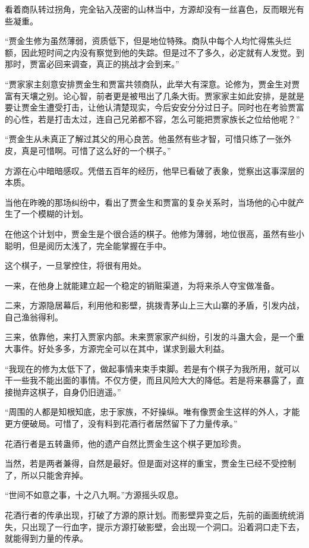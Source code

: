 \begin{this_body}
看着商队转过拐角，完全钻入茂密的山林当中，方源却没有一丝喜色，反而眼光有些凝重。

“贾金生修为虽然薄弱，资质低下，但是地位特殊。商队中每个人均忙得焦头烂额，因此短时间之内没有察觉到他的失踪。但是过不了多久，必定就有人发觉。到那时，贾富必回来调查，真正的挑战才会到来。”

“贾家家主刻意安排贾金生和贾富共领商队，此举大有深意。论修为，贾金生对贾富有天壤之别。论心智，前者更是被甩出了几条大街。贾家家主如此安排，是就是要让贾金生遭受打击，让他认清楚现实，今后安安分分过日子。同时也在考验贾富的心性，若是打击太过，连自己兄弟都不容，怎么可能把贾家族长之位给他呢？”

“贾金生从未真正了解过其父的用心良苦。他虽然有些才智，可惜只练了一张外皮，真是可惜啊。可惜了这么好的一个棋子。”

方源在心中暗暗感叹。凭借五百年的经历，他早已看破了表象，觉察出这事深层的本质。

当他在昨晚的那场纠纷中，看出了贾金生和贾富的复杂关系时，当场他的心中就产生了一个模糊的计划。

在他这个计划中，贾金生是个很合适的棋子。他修为薄弱，地位很高，虽然有些小聪明，但是阅历太浅了，完全能掌握在手中。

这个棋子，一旦掌控住，将很有用处。

一来，在他身上就能建立起一个稳定的销赃渠道，为将来杀人夺宝做准备。

二来，方源隐居幕后，利用他和影壁，挑拨青茅山上三大山寨的矛盾，引发内战，自己渔翁得利。

三来，依靠他，来打入贾家内部。未来贾家家产纠纷，引发的斗蛊大会，是一个重大事件。好处多多，方源完全可以在其中，谋求到最大利益。

“我现在的修为太低下了，做起事情来束手束脚。若是有个棋子为我所用，就可以干一些我不能出面的事情。不仅方便，而且风险大大的降低。若是将来暴露了，直接抛弃这棋子，自身仍旧逍遥。”

“周围的人都是知根知底，忠于家族，不好操纵。唯有像贾金生这样的外人，才能更方便破局。可惜了，没有料到花酒行者居然留下了力量传承。”

花酒行者是五转蛊师，他的遗产自然比贾金生这个棋子更加珍贵。

当然，若是两者兼得，自然是最好。但是面对这样的重宝，贾金生已经不受控制了，所以只能舍弃掉。

“世间不如意之事，十之八九啊。”方源摇头叹息。

花酒行者的传承出现，打破了方源的原计划。而影壁异变之后，先前的画面统统消失，只出现了一行血字，提示方源打破影壁，会出现一个洞口。沿着洞口走下去，就能得到力量的传承。


\end{this_body}
